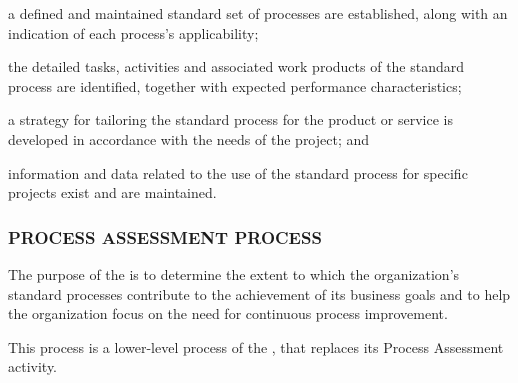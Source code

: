 			\begin{adjustwidth}{2em}{0pt} 

				\begin{compactitem}

					\item a defined and maintained standard set of processes are established, along with an indication of each process's applicability;

					\item the detailed tasks, activities and associated work products of the standard process are identified, together with expected performance characteristics;

					\item a strategy for tailoring the standard process for the product or service is developed in accordance with the needs of the project; and

					\item information and data related to the use of the standard process for specific projects exist and are maintained.

				\end{compactitem}

			\end{adjustwidth}

		\subsubsection{PROCESS ASSESSMENT PROCESS\label{llproc:process_assessment_process}}

			\begin{adjustwidth}{2em}{0pt} 
				
				The purpose of the  is to determine the extent to which the organization's standard processes contribute to the achievement of its business goals and to help the organization focus on the need for continuous process improvement.

				This process is a lower-level process of the , that replaces its Process Assessment activity.

			\end{adjustwidth}

